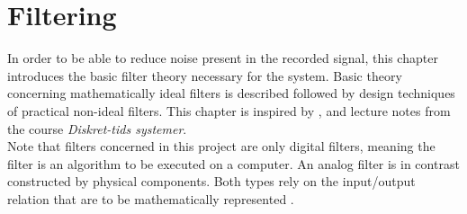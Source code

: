 \chapter{Filtering} \label{ch8}
In order to be able to reduce noise present in the recorded signal, this chapter introduces the basic filter theory necessary for the system. Basic theory concerning mathematically ideal filters is described followed by design techniques of practical non-ideal filters. This chapter is inspired by \cite{chapters 5, 7, DTSP}, \cite{section 3.4.4, FSP} and lecture notes from the course \textit{Diskret-tids systemer}. \\
Note that filters concerned in this project are only digital filters, meaning the filter is an algorithm to be executed on a computer. An analog filter is in contrast constructed by physical components. Both types rely on the input/output relation that are to be mathematically represented .





